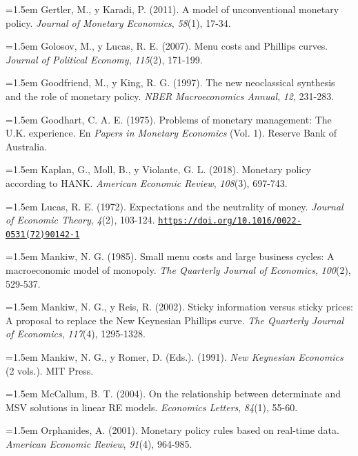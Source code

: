 \documentclass[10pt,a4paper]{article}
\begin{document}
\noindent\hangindent=1.5em Gertler, M., y Karadi, P. (2011). A model of unconventional monetary policy. \textit{Journal of Monetary Economics}, \textit{58}(1), 17-34.

\noindent\hangindent=1.5em Golosov, M., y Lucas, R. E. (2007). Menu costs and Phillips curves. \textit{Journal of Political Economy}, \textit{115}(2), 171-199.

\noindent\hangindent=1.5em Goodfriend, M., y King, R. G. (1997). The new neoclassical synthesis and the role of monetary policy. \textit{NBER Macroeconomics Annual}, \textit{12}, 231-283.

\noindent\hangindent=1.5em Goodhart, C. A. E. (1975). Problems of monetary management: The U.K. experience. En \textit{Papers in Monetary Economics} (Vol. 1). Reserve Bank of Australia.

\noindent\hangindent=1.5em Kaplan, G., Moll, B., y Violante, G. L. (2018). Monetary policy according to HANK. \textit{American Economic Review}, \textit{108}(3), 697-743.

\noindent\hangindent=1.5em Lucas, R. E. (1972). Expectations and the neutrality of money. \textit{Journal of Economic Theory}, \textit{4}(2), 103-124. \href{https://doi.org/10.1016/0022-0531(72)90142-1}{\nolinkurl{https://doi.org/10.1016/0022-0531(72)90142-1}}

\noindent\hangindent=1.5em Mankiw, N. G. (1985). Small menu costs and large business cycles: A macroeconomic model of monopoly. \textit{The Quarterly Journal of Economics}, \textit{100}(2), 529-537.

\noindent\hangindent=1.5em Mankiw, N. G., y Reis, R. (2002). Sticky information versus sticky prices: A proposal to replace the New Keynesian Phillips curve. \textit{The Quarterly Journal of Economics}, \textit{117}(4), 1295-1328.

\noindent\hangindent=1.5em Mankiw, N. G., y Romer, D. (Eds.). (1991). \textit{New Keynesian Economics} (2 vols.). MIT Press.

\noindent\hangindent=1.5em McCallum, B. T. (2004). On the relationship between determinate and MSV solutions in linear RE models. \textit{Economics Letters}, \textit{84}(1), 55-60.

\noindent\hangindent=1.5em Orphanides, A. (2001). Monetary policy rules based on real-time data. \textit{American Economic Review}, \textit{91}(4), 964-985.
\end{document}
